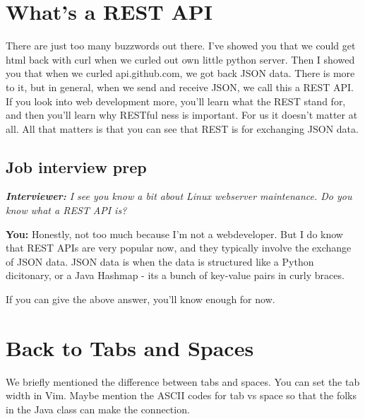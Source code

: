 \documentclass[10pt]{article}
\begin{document}
\section{What's a REST API}
There are just too many buzzwords out there. I've showed you that we could get html back with curl when we curled out own little python server. Then I showed you that when we curled api.github.com, we got back JSON data. There is more to it, but in general, when we send and receive JSON, we call this a REST API. If you look into web development more, you'll  learn what the REST stand for, and then you'll learn why RESTful ness is important. For us it doesn't matter at all. All that matters is that you can see that REST is for exchanging JSON data.

\subsection{Job interview prep}
\noindent\textit{\textbf{Interviewer:} I see you know a bit about Linux webserver maintenance. Do you know what a REST API is?}

\noindent \textbf{You: } Honestly, not too much because I'm not a webdeveloper. But I do know that REST APIs are very popular now, and they typically involve the exchange of JSON data. JSON data is when the data is structured like a Python dicitonary, or a Java Hashmap  - its a bunch of key-value pairs in curly braces.

If you can give the above answer, you'll know enough for now.

\section{Back to Tabs and Spaces}
We briefly mentioned the difference between tabs and spaces. You can set the tab width in Vim. Maybe mention the ASCII codes for tab vs space so that the folks in the Java class can make the connection.
\end{document}
